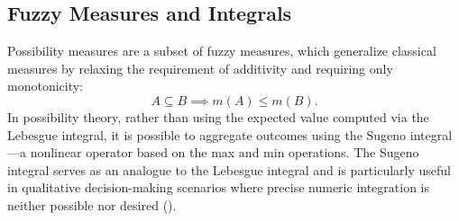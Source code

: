 \documentclass[12pt,a4paper]{report}
\begin{document}
\subsection{Fuzzy Measures and Integrals}
Possibility measures are a subset of fuzzy measures, which generalize classical measures by relaxing the requirement of additivity and requiring only monotonicity:
\[
A \subseteq B \implies m(A) \leq m(B).
\]
In possibility theory, rather than using the expected value computed via the Lebesgue integral, it is possible to aggregate outcomes using the Sugeno integral—a nonlinear operator based on the max and min operations. The Sugeno integral serves as an analogue to the Lebesgue integral and is particularly useful in qualitative decision-making scenarios where precise numeric integration is neither possible nor desired (\cite{Dubois:2015}).
\end{document}
